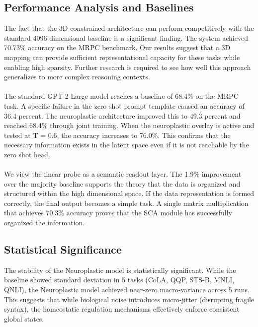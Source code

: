 \documentclass[11pt, letterpaper]{article}
\begin{document}
\subsection{Performance Analysis and Baselines} The fact that the 3D constrained architecture can perform competitively with the standard 4096 dimensional baseline is a significant finding. The system achieved 70.73\% accuracy on the MRPC benchmark. Our results suggest that a 3D mapping can provide sufficient representational capacity for these tasks while enabling high sparsity. Further research is required to see how well this approach generalizes to more complex reasoning contexts.

\paragraph{}
The standard GPT-2 Large model reaches a baseline of 68.4\% on the MRPC task. A specific failure in the zero shot prompt template caused an accuracy of 36.4 percent. The neuroplastic architecture improved this to 49.3 percent and reached 68.4\% through joint training. When the neuroplastic overlay is active and tested at T = 0.6, the accuracy increases to 76.0\%. This confirms that the necessary information exists in the latent space even if it is not reachable by the zero shot head.

\paragraph{}
We view the linear probe as a semantic readout layer. The 1.9\% improvement over the majority baseline supports the theory that the data is organized and structured within the high dimensional space. If the data representation is formed correctly, the final output becomes a simple task. A single matrix multiplication that achieves 70.3\% accuracy proves that the SCA module has successfully organized the information.

\subsection{Statistical Significance}
The stability of the Neuroplastic model is statistically significant. While the baseline showed standard deviation in 5 tasks (CoLA, QQP, STS-B, MNLI, QNLI), the Neuroplastic model achieved near-zero macro-variance across 5 runs. This suggests that while biological noise introduces micro-jitter (disrupting fragile syntax), the homeostatic regulation mechanisms effectively enforce consistent global states.
\end{document}
